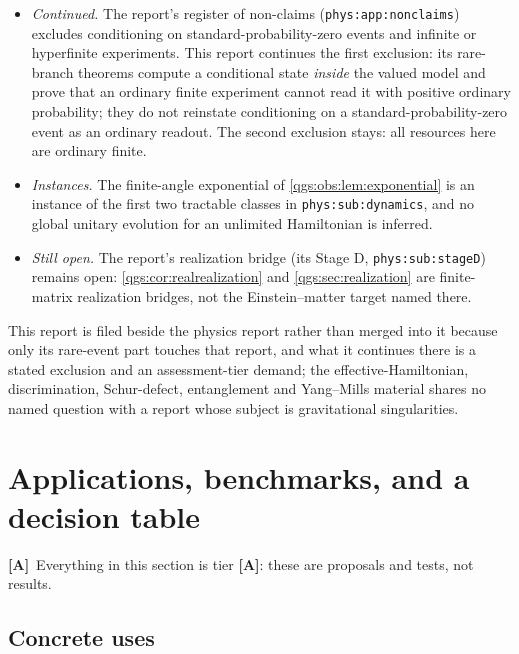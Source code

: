 \documentclass[11pt,oneside]{article}
\numberwithin{equation}{section}
\theoremstyle{plain}
\theoremstyle{definition}
\theoremstyle{remark}
\newcommand{\TA}{\textcolor{TierA}{\textsf{\bfseries[A]}}}
\begin{document}
\begin{itemize}
\item \emph{Continued.} The report's register of non-claims (\texttt{phys:app:nonclaims}) excludes conditioning on standard-probability-zero events and infinite or hyperfinite experiments. This report continues the first exclusion: its rare-branch theorems compute a conditional state \emph{inside} the valued model and prove that an ordinary finite experiment cannot read it with positive ordinary probability; they do not reinstate conditioning on a standard-probability-zero event as an ordinary readout. The second exclusion stays: all resources here are ordinary finite.
\item \emph{Instances.} The finite-angle exponential of \cref{qgs:obs:lem:exponential} is an instance of the first two tractable classes in \texttt{phys:sub:dynamics}, and no global unitary evolution for an unlimited Hamiltonian is inferred.
\item \emph{Still open.} The report's realization bridge (its Stage D, \texttt{phys:sub:stageD}) remains open: \cref{qgs:cor:realrealization} and \cref{qgs:sec:realization} are finite-matrix realization bridges, not the Einstein--matter target named there.
\end{itemize}
This report is filed beside the physics report rather than merged into it because only its rare-event part touches that report, and what it continues there is a stated exclusion and an assessment-tier demand; the effective-Hamiltonian, discrimination, Schur-defect, entanglement and Yang--Mills material shares no named question with a report whose subject is gravitational singularities.

\section{Applications, benchmarks, and a decision table}\label{qgs:sec:applications}
\TA\ Everything in this section is tier \TA: these are proposals and tests, not results.

\subsection{Concrete uses}
\end{document}
